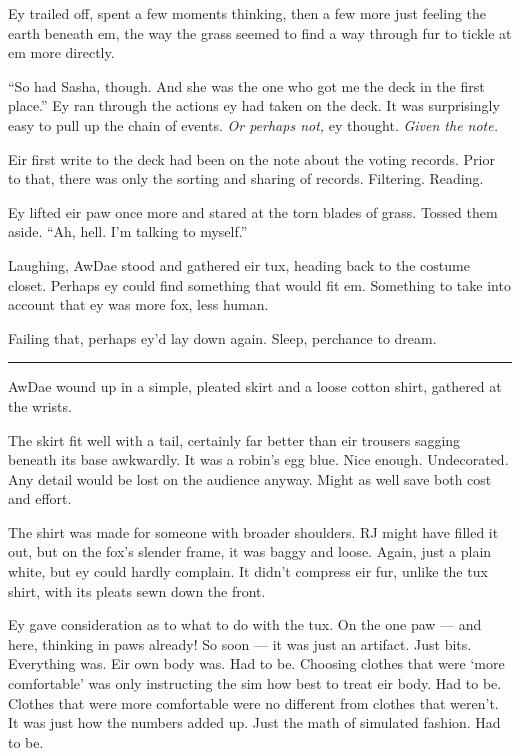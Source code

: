 Ey trailed off, spent a few moments thinking, then a few more just feeling the earth beneath em, the way the grass seemed to find a way through fur to tickle at em more directly.

``So had Sasha, though. And she was the one who got me the deck in the first place.'' Ey ran through the actions ey had taken on the deck. It was surprisingly easy to pull up the chain of events. \emph{Or perhaps not,} ey thought. \emph{Given the note.}

Eir first write to the deck had been on the note about the voting records. Prior to that, there was only the sorting and sharing of records. Filtering. Reading.

Ey lifted eir paw once more and stared at the torn blades of grass. Tossed them aside. ``Ah, hell. I'm talking to myself.''

Laughing, AwDae stood and gathered eir tux, heading back to the costume closet. Perhaps ey could find something that would fit em. Something to take into account that ey was more fox, less \mbox{human}.

Failing that, perhaps ey'd lay down again. Sleep, perchance to dream.

\begin{center}\rule{0.5\linewidth}{0.5pt}\end{center}

AwDae wound up in a simple, pleated skirt and a loose cotton shirt, gathered at the wrists.

The skirt fit well with a tail, certainly far better than eir trousers sagging beneath its base awkwardly. It was a robin's egg blue. Nice enough. Undecorated. Any detail would be lost on the audience anyway. Might as well save both cost and effort.

The shirt was made for someone with broader shoulders. RJ might have filled it out, but on the fox's slender frame, it was baggy and loose. Again, just a plain white, but ey could hardly complain. It didn't compress eir fur, unlike the tux shirt, with its pleats sewn down the front.

Ey gave consideration as to what to do with the tux. On the one paw — and here, thinking in paws already! So soon — it was just an artifact. Just bits. Everything was. Eir own body was. Had to be. Choosing clothes that were `more comfortable' was only instructing the sim how best to treat eir body. Had to be. Clothes that were more comfortable were no different from clothes that weren't. It was just how the numbers added up. Just the math of simulated fashion. Had to be.

